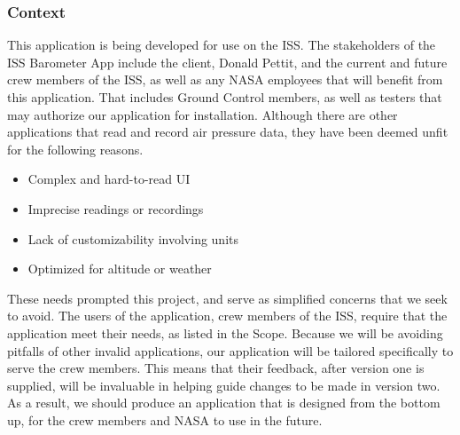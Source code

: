 \documentclass[onecolumn, draftclsnofoot,10pt, compsoc]{IEEEtran}
\def \CapstoneProjectName{ISS Barometer App }
\begin{document}
\subsubsection{Context}
This application is being developed for use on the ISS.
The stakeholders of the \CapstoneProjectName include the client, Donald Pettit, and the current and future crew members of the ISS, as well as any NASA employees that will benefit from this application.
That includes Ground Control members, as well as testers that may authorize our application for installation.
Although there are other applications that read and record air pressure data, they have been deemed unfit for the following reasons.
\begin{itemize}
	\item Complex and hard-to-read UI
	\item Imprecise readings or recordings
	\item Lack of customizability involving units
	\item Optimized for altitude or weather
\end{itemize}
These needs prompted this project, and serve as simplified concerns that we seek to avoid.
The users of the application, crew members of the ISS, require that the application meet their needs, as listed in the Scope.
Because we will be avoiding pitfalls of other invalid applications, our application will be tailored specifically to serve the crew members.
This means that their feedback, after version one is supplied, will be invaluable in helping guide changes to be made in version two.
As a result, we should produce an application that is designed from the bottom up, for the crew members and NASA to use in the future.
\end{document}
